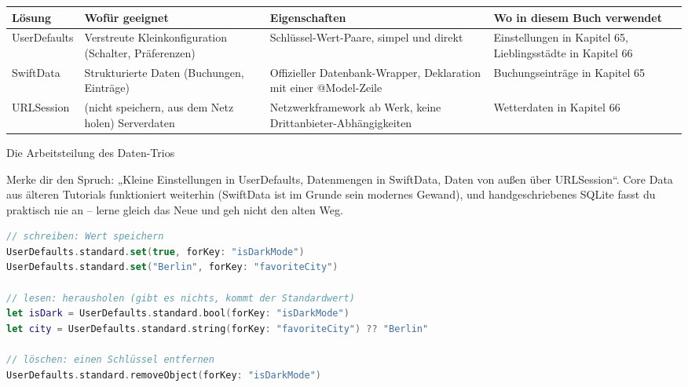 


\begin{center}
\begin{tabularx}{\linewidth}{|X|X|X|X|}
\hline
\textbf{Lösung} & \textbf{Wofür geeignet} & \textbf{Eigenschaften} & \textbf{Wo in diesem Buch verwendet} \tabularnewline
\hline
UserDefaults & Verstreute Kleinkonfiguration (Schalter, Präferenzen) & Schlüssel-Wert-Paare, simpel und direkt & Einstellungen in Kapitel 65, Lieblingsstädte in Kapitel 66 \tabularnewline
SwiftData & Strukturierte Daten (Buchungen, Einträge) & Offizieller Datenbank-Wrapper, Deklaration mit einer @Model-Zeile & Buchungseinträge in Kapitel 65 \tabularnewline
URLSession & (nicht speichern, aus dem Netz holen) Serverdaten & Netzwerkframework ab Werk, keine Drittanbieter-Abhängigkeiten & Wetterdaten in Kapitel 66 \tabularnewline
\hline
\end{tabularx}
\end{center}

\begin{center}\small\color{gray}Die Arbeitsteilung des Daten-Trios\end{center}

Merke dir den Spruch: „Kleine Einstellungen in UserDefaults, Datenmengen in SwiftData, Daten von außen über URLSession“. Core Data aus älteren Tutorials funktioniert weiterhin (SwiftData ist im Grunde sein modernes Gewand), und handgeschriebenes SQLite fasst du praktisch nie an – lerne gleich das Neue und geh nicht den alten Weg.


\begin{lstlisting}[language=Swift]
// schreiben: Wert speichern
UserDefaults.standard.set(true, forKey: "isDarkMode")
UserDefaults.standard.set("Berlin", forKey: "favoriteCity")

// lesen: herausholen (gibt es nichts, kommt der Standardwert)
let isDark = UserDefaults.standard.bool(forKey: "isDarkMode")
let city = UserDefaults.standard.string(forKey: "favoriteCity") ?? "Berlin"

// löschen: einen Schlüssel entfernen
UserDefaults.standard.removeObject(forKey: "isDarkMode")
\end{lstlisting}

